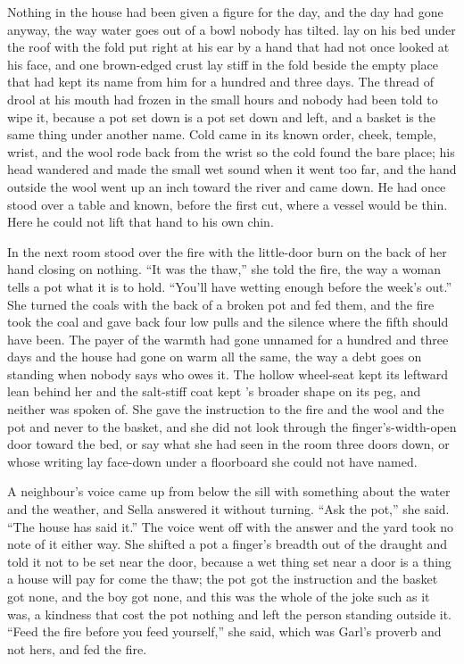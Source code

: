 Nothing in the house had been given a figure for the day, and the day had gone anyway, the way water goes out of a bowl nobody has tilted.  lay on his bed under the  roof with the fold put right at his ear by a hand that had not once looked at his face, and one brown-edged crust lay stiff in the fold beside the empty place that had kept its name from him for a hundred and three days. The thread of drool at his mouth had frozen in the small hours and nobody had been told to wipe it, because a pot set down is a pot set down and left, and a basket is the same thing under another name. Cold came in its known order, cheek, temple, wrist, and the wool rode back from the wrist so the cold found the bare place; his head wandered and made the small wet sound when it went too far, and the hand outside the wool went up an inch toward the river and came down. He had once stood over a table and known, before the first cut, where a vessel would be thin. Here he could not lift that hand to his own chin.

In the next room  stood over the fire with the little-door burn on the back of her hand closing on nothing. “It was the thaw,” she told the fire, the way a woman tells a pot what it is to hold. “You'll have wetting enough before the week's out.” She turned the coals with the back of a broken pot and fed them, and the fire took the coal and gave back four low pulls and the silence where the fifth should have been. The payer of the warmth had gone unnamed for a hundred and three days and the house had gone on warm all the same, the way a debt goes on standing when nobody says who owes it. The hollow wheel-seat kept its leftward lean behind her and the salt-stiff coat kept 's broader shape on its peg, and neither was spoken of. She gave the instruction to the fire and the wool and the pot and never to the basket, and she did not look through the finger's-width-open door toward the bed, or say what she had seen in the room three doors down, or whose writing lay face-down under a floorboard she could not have named.

A neighbour's voice came up from below the sill with something about the water and the weather, and Sella answered it without turning. “Ask the pot,” she said. “The house has said it.” The voice went off with the answer and the yard took no note of it either way. She shifted a pot a finger's breadth out of the draught and told it not to be set near the door, because a wet thing set near a door is a thing a house will pay for come the thaw; the pot got the instruction and the basket got none, and the boy got none, and this was the whole of the joke such as it was, a kindness that cost the pot nothing and left the person standing outside it. “Feed the fire before you feed yourself,” she said, which was Garl's proverb and not hers, and fed the fire.

